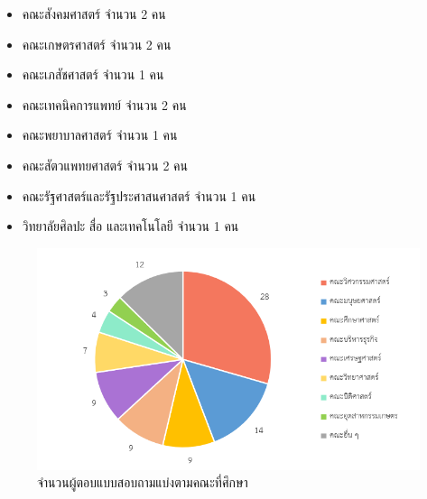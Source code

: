 \begin{itemize}
  \item คณะสังคมศาสตร์ จำนวน 2 คน
  \item คณะเกษตรศาสตร์ จำนวน 2 คน
  \item คณะเภสัชศาสตร์ จำนวน 1 คน
  \item คณะเทคนิคการแพทย์ จำนวน 2 คน
  \item คณะพยาบาลศาสตร์ จำนวน 1 คน
  \item คณะสัตวแพทยศาสตร์ จำนวน 2 คน
  \item คณะรัฐศาสตร์และรัฐประศาสนศาสตร์ จำนวน 1 คน
  \item วิทยาลัยศิลปะ สื่อ และเทคโนโลยี จำนวน 1 คน
\end{itemize}
\begin{figure}
  \begin{center}
    \includegraphics[width=\linewidth]{images/group_by_faculty.png}
  \end{center}
  \caption[จำนวนผู้ตอบแบบสอบถามแบ่งตามคณะที่ศึกษา]{จำนวนผู้ตอบแบบสอบถามแบ่งตามคณะที่ศึกษา}
  \label{fig:faculty}     
\end{figure}

